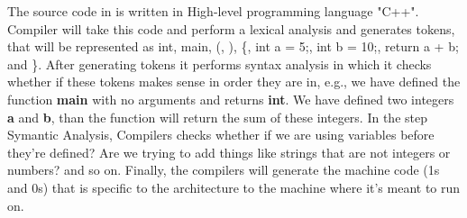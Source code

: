 The source code in  is written in High-level programming language "C++". Compiler will take this code and perform a lexical analysis and generates tokens, that will be represented as int, main, (, ), \{, int a = 5;, int b = 10;, return a + b; and \}. After generating tokens it performs syntax analysis in which it checks whether if these tokens makes sense in order they are in, e.g., we have defined the function \textbf{main} with no arguments and returns \textbf{int}. We have defined two integers \textbf{a} and \textbf{b}, than the function will return the sum of these integers. In the step Symantic Analysis, Compilers checks whether if we are using variables before they're defined? Are we trying to add things like strings that are not integers or numbers? and so on. Finally, the compilers will generate the machine code (1s and 0s) that is specific to the architecture to the machine where it's meant to run on.